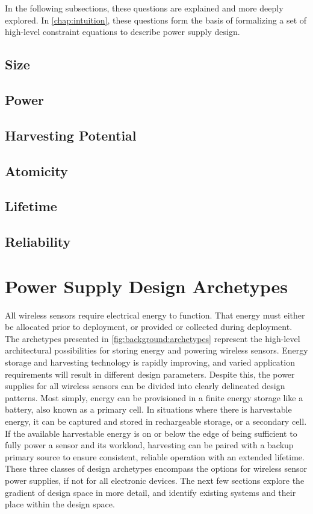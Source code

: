 In the following subsections, these questions are explained and more deeply explored. In \cref{chap:intuition}, these questions form the basis of formalizing a set of high-level constraint equations to describe power supply design.

\subsection{Size}

\subsection{Power}

\subsection{Harvesting Potential}

\subsection{Atomicity}

\subsection{Lifetime}

\subsection{Reliability}





\section{Power Supply Design Archetypes}

All wireless sensors require electrical energy to function. 
That energy must either be allocated prior to deployment, or provided or collected during deployment. 
The archetypes presented in \cref{fig:background:archetypes} represent the high-level architectural possibilities for storing energy and powering wireless sensors.
Energy storage and harvesting technology is rapidly improving, and varied application requirements will result in different design parameters. Despite this, the power supplies for all wireless sensors can be divided into clearly delineated design patterns. 
Most simply, energy can be provisioned in a finite energy storage like a battery, also known as a primary cell. In situations where there is harvestable energy, it can be captured and stored in rechargeable storage, or a secondary cell. 
If the available harvestable energy is on or below the edge of being sufficient to fully power a sensor and its workload, harvesting can be paired with a backup primary source to ensure consistent, reliable operation with an extended lifetime. 
These three classes of design archetypes encompass the options for wireless sensor power supplies, if not for all electronic devices. 
The next few sections explore the gradient of design space in more detail, and identify existing systems and their place within the design space. 

